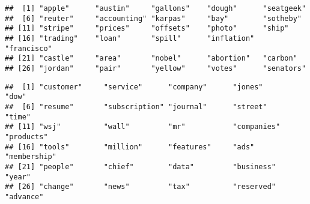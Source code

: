 \documentclass[
]{article}
\newenvironment{Shaded}{\begin{snugshade}}{\end{snugshade}}
\newcommand{\CommentTok}[1]{\textcolor[rgb]{0.56,0.35,0.01}{\textit{#1}}}
\newcommand{\DecValTok}[1]{\textcolor[rgb]{0.00,0.00,0.81}{#1}}
\newcommand{\FunctionTok}[1]{\textcolor[rgb]{0.00,0.00,0.00}{#1}}
\newcommand{\NormalTok}[1]{#1}
\newcommand{\OtherTok}[1]{\textcolor[rgb]{0.56,0.35,0.01}{#1}}
\newcommand{\SpecialCharTok}[1]{\textcolor[rgb]{0.00,0.00,0.00}{#1}}
\begin{document}
\begin{Shaded}
\end{Shaded}

\begin{verbatim}
##  [1] "apple"      "austin"     "gallons"    "dough"      "seatgeek"  
##  [6] "reuter"     "accounting" "karpas"     "bay"        "sotheby"   
## [11] "stripe"     "prices"     "offsets"    "photo"      "ship"      
## [16] "trading"    "loan"       "spill"      "inflation"  "francisco" 
## [21] "castle"     "area"       "nobel"      "abortion"   "carbon"    
## [26] "jordan"     "pair"       "yellow"     "votes"      "senators"
\end{verbatim}

\begin{Shaded}
\end{Shaded}

\begin{verbatim}
##  [1] "customer"     "service"      "company"      "jones"        "dow"         
##  [6] "resume"       "subscription" "journal"      "street"       "time"        
## [11] "wsj"          "wall"         "mr"           "companies"    "products"    
## [16] "tools"        "million"      "features"     "ads"          "membership"  
## [21] "people"       "chief"        "data"         "business"     "year"        
## [26] "change"       "news"         "tax"          "reserved"     "advance"
\end{verbatim}
\end{document}
